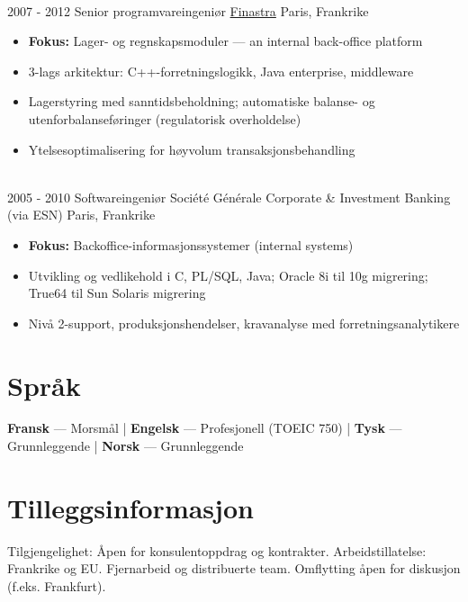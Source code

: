 \documentclass[letterpaper]{twentysecondcv} %
\begin{document}
\begin{twentytimeline}
{\begin{itemize}
		\end{itemize}}
	\\
	\twentyitemtimeline{\faCode}
		{2007 -}
		{2012}
		{Senior programvareingeniør}
		{\href{https://finastra.com}{Finastra}}
		{Paris, Frankrike}
		{\begin{itemize}
		\item \textbf{Fokus:} Lager- og regnskapsmoduler — an internal back-office platform
		\item 3-lags arkitektur: C++-forretningslogikk, Java enterprise, middleware
		\item Lagerstyring med sanntidsbeholdning; automatiske balanse- og utenforbalanseføringer (regulatorisk overholdelse)
		\item Ytelsesoptimalisering for høyvolum transaksjonsbehandling
		\end{itemize}}
	\\
	\twentyitemtimeline{\faBriefcase}
		{2005 -}
		{2010}
		{Softwareingeniør}
		{Société Générale Corporate \& Investment Banking (via ESN)}
		{Paris, Frankrike}
		{\begin{itemize}
		\item \textbf{Fokus:} Backoffice-informasjonssystemer (internal systems)
		\item Utvikling og vedlikehold i C, PL/SQL, Java; Oracle 8i til 10g migrering; True64 til Sun Solaris migrering
		\item Nivå 2-support, produksjonshendelser, kravanalyse med forretningsanalytikere
		\end{itemize}}
\end{twentytimeline}


\section{Språk}

\textbf{Fransk} — Morsmål | \textbf{Engelsk} — Profesjonell (TOEIC 750) | \textbf{Tysk} — Grunnleggende | \textbf{Norsk} — Grunnleggende

\section{Tilleggsinformasjon}

Tilgjengelighet: Åpen for konsulentoppdrag og kontrakter. Arbeidstillatelse: Frankrike og EU. Fjernarbeid og distribuerte team. Omflytting åpen for diskusjon (f.eks. Frankfurt).

\end{document}

